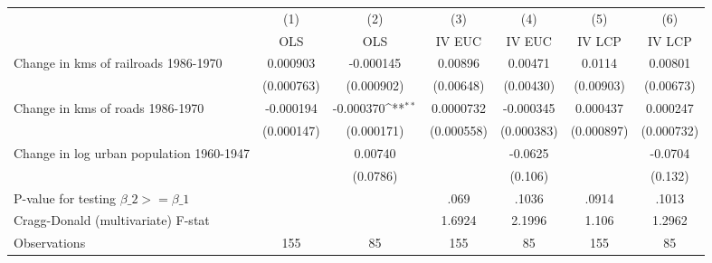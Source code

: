 {
\def\sym#1{\ifmmode^{#1}\else\(^{#1}\)\fi}
\begin{tabular}{l*{6}{c}}
\hline\hline
                &\multicolumn{1}{c}{(1)}&\multicolumn{1}{c}{(2)}&\multicolumn{1}{c}{(3)}&\multicolumn{1}{c}{(4)}&\multicolumn{1}{c}{(5)}&\multicolumn{1}{c}{(6)}\\
                &\multicolumn{1}{c}{OLS}&\multicolumn{1}{c}{OLS}&\multicolumn{1}{c}{IV EUC}&\multicolumn{1}{c}{IV EUC}&\multicolumn{1}{c}{IV LCP}&\multicolumn{1}{c}{IV LCP}\\
\hline
Change in kms of railroads 1986-1970& 0.000903         &-0.000145         &  0.00896         &  0.00471         &   0.0114         &  0.00801         \\
                &(0.000763)         &(0.000902)         &(0.00648)         &(0.00430)         &(0.00903)         &(0.00673)         \\
[1em]
Change in kms of roads 1986-1970&-0.000194         &-0.000370\sym{**} &0.0000732         &-0.000345         & 0.000437         & 0.000247         \\
                &(0.000147)         &(0.000171)         &(0.000558)         &(0.000383)         &(0.000897)         &(0.000732)         \\
[1em]
Change in log urban population 1960-1947&                  &  0.00740         &                  &  -0.0625         &                  &  -0.0704         \\
                &                  & (0.0786)         &                  &  (0.106)         &                  &  (0.132)         \\
\hline
P-value for testing $\beta\_{2} >= \beta\_{1}$&                  &                  &     .069         &    .1036         &    .0914         &    .1013         \\
Cragg-Donald (multivariate) F-stat&                  &                  &   1.6924         &   2.1996         &    1.106         &   1.2962         \\
Observations    &      155         &       85         &      155         &       85         &      155         &       85         \\
\hline\hline
\end{tabular}
}
